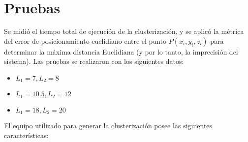 \section{Pruebas}

Se midió el tiempo total de ejecución de la clusterización, y se aplicó la métrica del error de posicionamiento euclidiano entre el punto $P(x_i, y_i, z_i)$ para determinar la máxima distancia Euclidiana (y por lo tanto, la imprecisión del sistema). Las pruebas se realizaron con los siguientes datos:

\begin{itemize}
	\item $L_1 = 7, L_2 = 8$
	\item $L_1 = 10.5, L_2 = 12$
	\item $L_1 = 18, L_2 = 20$
\end{itemize}

El equipo utilizado para generar la clusterización posee las siguientes características:

